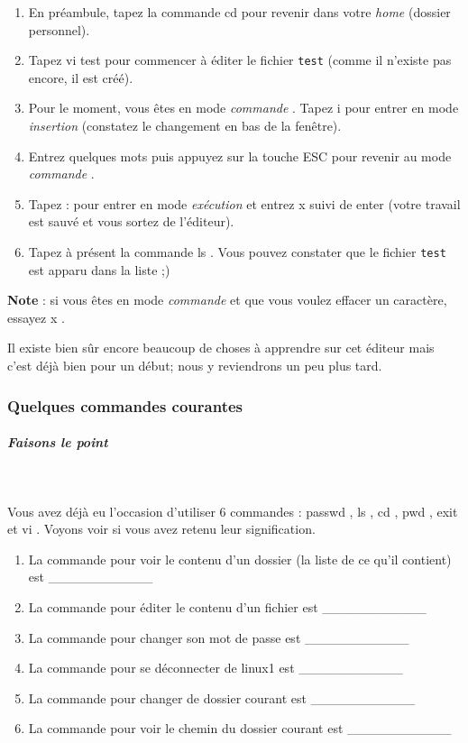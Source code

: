 \documentclass[11pt,a4paper]{article}
\begin{document}
					\begin{enumerate}
				
			\item En pr\'eambule, tapez la commande cd  pour revenir dans votre  \textit{home}  (dossier personnel).
	
			\item Tapez vi test  pour commencer \`a \'editer le fichier  \texttt{test}  (comme il n'existe pas encore, il est cr\'e\'e).
			\item Pour le moment, vous \^etes en mode  \textit{commande} . Tapez i  pour entrer en mode  \textit{insertion}  (constatez le changement en bas de la fen\^etre). 
			\item Entrez quelques mots puis appuyez sur la touche ESC  pour revenir au mode  \textit{commande} .
			\item Tapez :  pour entrer en mode  \textit{ex\'ecution}  et entrez x  suivi de enter  (votre travail est sauv\'e et vous sortez de l'\'editeur). 
			\item Tapez \`a pr\'esent la commande ls . Vous pouvez constater que le fichier  \texttt{test}  est apparu dans la liste ;)
					\end{enumerate}
				 \textbf{Note}  : si vous \^etes en mode  \textit{commande}  et que vous voulez effacer un caract\`ere, essayez x .

Il existe bien s\^ur encore beaucoup de choses \`a apprendre sur cet \'editeur mais c'est d\'ej\`a bien pour un d\'ebut; nous y reviendrons un peu plus tard.
			
		\subsubsection{Quelques commandes courantes} 
		\label{TD1TD1learningObject8.tex}
			
			
		\subparagraph{Faisons le point} 
		
                \textcolor{white}{.} \par
            
Vous avez d\'ej\`a eu l'occasion d'utiliser 6 commandes : passwd , ls , cd , pwd , exit  et vi . Voyons voir si vous avez retenu leur signification.

					\begin{enumerate}
				
			\item La commande pour voir le contenu d'un dossier (la liste de ce qu'il contient) est    
  \_\_\_\_\_\_\_\_\_\_\_ 
			\item La commande pour \'editer le contenu d'un fichier est    
  \_\_\_\_\_\_\_\_\_\_\_ 
			\item La commande pour changer son mot de passe est   
  \_\_\_\_\_\_\_\_\_\_\_ 
			\item La commande pour se d\'econnecter de linux1 est   
  \_\_\_\_\_\_\_\_\_\_\_ 
			\item La commande pour changer de dossier courant est         
  \_\_\_\_\_\_\_\_\_\_\_ 
			\item La commande pour voir le chemin du dossier courant est    
  \_\_\_\_\_\_\_\_\_\_\_ 
					\end{enumerate}
				
\end{document}
